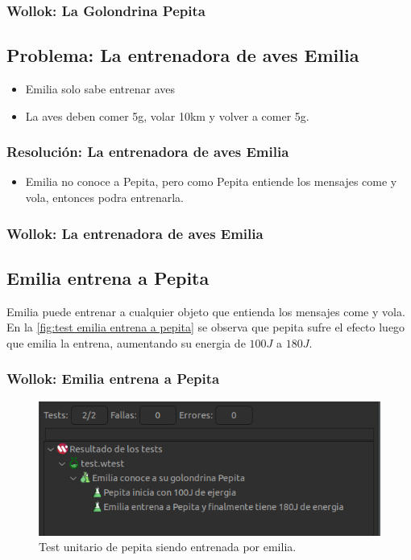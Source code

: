 \documentclass[11pt,a4paper]{article}
\begin{document}
\subsubsection{Wollok: La Golondrina Pepita}


\subsection{Problema: La entrenadora de aves Emilia}
\begin{itemize}
	\item Emilia solo sabe entrenar aves
	\item La aves deben comer 5g, volar 10km y volver a comer 5g.
\end{itemize}

\subsubsection{Resolución: La entrenadora de aves Emilia}
\begin{itemize}
	\item Emilia no conoce a Pepita, pero como Pepita entiende los mensajes come y vola, entonces podra entrenarla.
\end{itemize}

\subsubsection{Wollok: La entrenadora de aves Emilia}


\subsection{Emilia entrena a Pepita}
Emilia puede entrenar a cualquier objeto que entienda los mensajes come y vola. En la \autoref{fig:test emilia entrena a pepita} se observa que pepita sufre el efecto luego que emilia la entrena, aumentando su energia de $100J$ a $180J$.


\subsubsection{Wollok: Emilia entrena a Pepita}


\begin{figure}[H]
	\centering
	\includegraphics[scale=0.7]{figuras/test_pepita_emilia.png}
    \caption{Test unitario de pepita siendo entrenada por emilia.}
    \label{fig:test emilia entrena a pepita}
\end{figure}  
\end{document}
